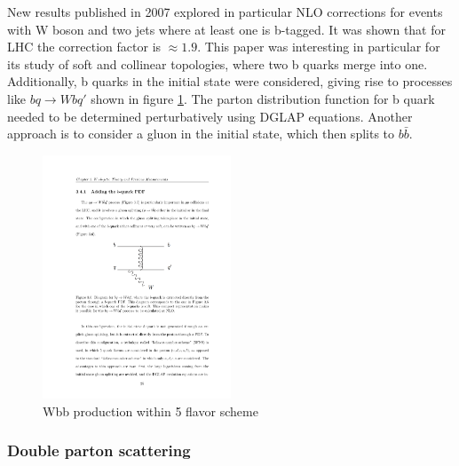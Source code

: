 \par New results published in 2007 explored in particular NLO corrections for events with W boson and two jets where at least one is b-tagged. It was shown that for LHC the correction factor is $\approx 1.9$. This paper was interesting in particular for its study of soft and collinear topologies, where two b quarks merge into one. Additionally, b quarks in the initial state were considered, giving rise to processes like $bq\rightarrow Wbq'$ shown in figure \ref{fig:5FS_diag}. The parton distribution function for b quark needed to be determined perturbatively using DGLAP equations. Another approach is to consider a gluon in the initial state, which then splits to $b\bar{b}$. 
\begin{figure}[htbp]
	\centering
		\includegraphics[width=0.5\textwidth]{Figures/5FS_diag.pdf}
	\caption[Wbb production within 5 flavor scheme]{Wbb production within 5 flavor scheme}
	\label{fig:5FS_diag}
\end{figure}

\subsubsection{Double parton scattering}
\label{sec:DPS}

